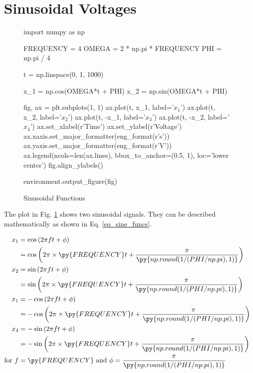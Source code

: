 \documentclass[10pt]{homework}
\author{\theauthor}
\title{\thedoctitle}
\begin{document}
\section{Sinusoidal Voltages}

\begin{center}
    \begin{figure}
        \begin{python}
import numpy as np

FREQUENCY = 4
OMEGA = 2 * np.pi * FREQUENCY
PHI = np.pi / 4

t = np.linspace(0, 1, 1000)

x_1 = np.cos(OMEGA*t + PHI)
x_2 = np.sin(OMEGA*t + PHI)

fig, ax = plt.subplots(1, 1)
ax.plot(t, x_1, label='$x_1$')
ax.plot(t, x_2, label='$x_2$')
ax.plot(t, -x_1, label='$x_3$')
ax.plot(t, -x_2, label='$x_4$')
ax.set_xlabel(r'Time')
ax.set_ylabel(r'Voltage')
ax.xaxis.set_major_formatter(eng_format(r'\unit{\second}'))
ax.yaxis.set_major_formatter(eng_format(r'\unit{\volt}'))
ax.legend(ncols=len(ax.lines), bbox_to_anchor=(0.5, 1), loc='lower center')
fig.align_ylabels()

environment.output_figure(fig)
        \end{python}
        \caption{Sinusoidal Functions}\label{fig_sine_funcs}
    \end{figure}
\end{center}

The plot in Fig. \ref{fig_sine_funcs} shows two sinusoidal signals. They can be described mathematically as shown in Eq. \ref{eq_sine_funcs}.

\begin{equation} \label{eq_sine_funcs}
    \begin{split}
        x_1 &= \cos\left(2\pi ft + \phi\right) \\
            &= \cos\left(2\pi \times \py{FREQUENCY}t + \frac{\pi}{\py{np.round(1/(PHI/np.pi), 1)}}\right) \\
        x_2 &= \sin\left(2\pi ft + \phi\right) \\
            &= \sin\left(2\pi \times \py{FREQUENCY}t + \frac{\pi}{\py{np.round(1/(PHI/np.pi), 1)}}\right) \\
        x_1 &= -\cos\left(2\pi ft + \phi\right) \\
            &= -\cos\left(2\pi \times \py{FREQUENCY}t + \frac{\pi}{\py{np.round(1/(PHI/np.pi), 1)}}\right) \\
        x_4 &= -\sin\left(2\pi ft + \phi\right) \\
            &= -\sin\left(2\pi \times \py{FREQUENCY}t + \frac{\pi}{\py{np.round(1/(PHI/np.pi), 1)}}\right) \\
        \mathrm{for\ } f &= \py{FREQUENCY} \mathrm{\ and\ } \phi = \frac{\pi}{\py{np.round(1/(PHI/np.pi), 1)}}
    \end{split}
\end{equation}
\end{document}
